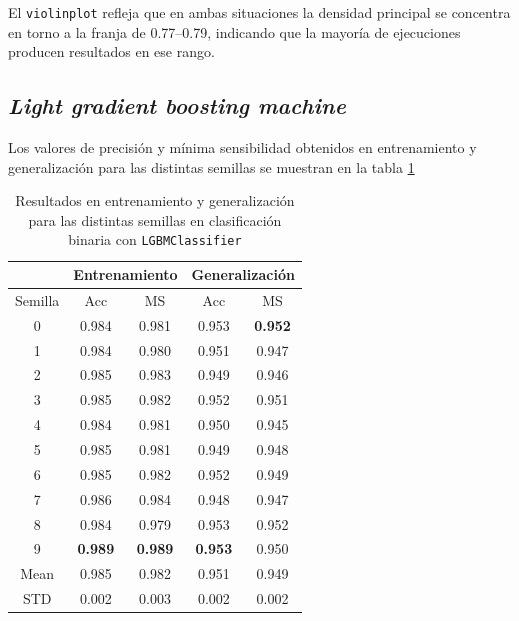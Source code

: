 \vspace{1em}

El \texttt{violinplot} refleja que en ambas situaciones la densidad principal se concentra en torno a la franja de 0.77–0.79, indicando que la mayoría de ejecuciones producen resultados en ese rango.

\subsection{\textit{Light gradient boosting machine}}
\label{subsec:lgbm_bin}

Los valores de precisión y mínima sensibilidad obtenidos en entrenamiento y generalización para las distintas semillas se muestran en la tabla \ref{tabla:lgbm_bin}

\begin{table}[H]
	\centering
	\begin{tabular}{ |c|c|c|c|c| }
		\hline
		\rowcolor{LightCyan}
		 & \multicolumn{2}{c|}{Entrenamiento} & \multicolumn{2}{c|}{Generalización} \\
		\hline
		\rowcolor{LightCyan}
		 Semilla & Acc & MS & Acc & MS \\
		\hline
		0    & 0.984          & 0.981          & 0.953          & \textbf{0.952} \\
		1    & 0.984          & 0.980          & 0.951          & 0.947          \\
		2    & 0.985          & 0.983          & 0.949          & 0.946          \\
		3    & 0.985          & 0.982          & 0.952          & 0.951          \\
		4    & 0.984          & 0.981          & 0.950          & 0.945          \\
		5    & 0.985          & 0.981          & 0.949          & 0.948          \\
		6    & 0.985          & 0.982          & 0.952          & 0.949          \\
		7    & 0.986          & 0.984          & 0.948          & 0.947          \\
		8    & 0.984          & 0.979          & 0.953          & 0.952          \\
		9    & \textbf{0.989} & \textbf{0.989} & \textbf{0.953} & 0.950          \\
		Mean & 0.985          & 0.982          & 0.951          & 0.949          \\
		STD  & 0.002          & 0.003          & 0.002          & 0.002          \\
		\hline
	\end{tabular}
	\caption{Resultados en entrenamiento y generalización para las distintas semillas en clasificación binaria con \texttt{LGBMClassifier}}
	\label{tabla:lgbm_bin}
\end{table}

